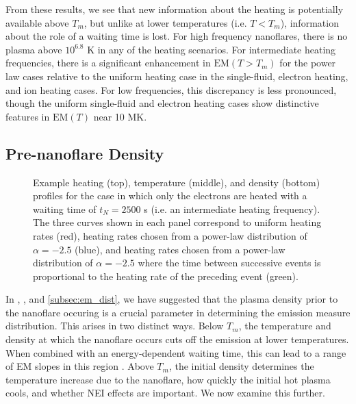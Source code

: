\documentclass[preprint,linenumbers]{aastex}
\begin{document}
	\par From these results, we see that new information about the heating is potentially available above $T_m$, but unlike at lower temperatures (i.e. $T<T_m$), information about the role of a waiting time is lost. For high frequency nanoflares, there is no plasma above $10^{6.8}$ K in any of the heating scenarios. For intermediate heating frequencies, there is a significant enhancement in $\mathrm{EM}(T>T_m)$ for the power law cases relative to the uniform heating case in the single-fluid, electron heating, and ion heating cases. For low frequencies, this discrepancy is less pronounced, though the uniform single-fluid and electron heating cases show distinctive features in $\mathrm{EM}(T)$ near 10 MK.
	\subsection{Pre-nanoflare Density}
	\label{subsec:pre_nanoflare_density}
	\begin{figure*}
		\caption{Example heating (top), temperature (middle), and density (bottom) profiles for the case in which only the electrons are heated with a waiting time of $t_N=2500$ s (i.e. an intermediate heating frequency). The three curves shown in each panel correspond to uniform heating rates (red), heating rates chosen from a power-law distribution of $\alpha=-2.5$ (blue), and heating rates chosen from a power-law distribution of $\alpha=-2.5$ where the time between successive events is proportional to the heating rate of the preceding event (green).}
		\label{fig:nT_sample_profiles}
	\end{figure*}
	\par In \citet{cargill_active_2014}, , and \autoref{subsec:em_dist}, we have suggested that the plasma density prior to the nanoflare occuring is a crucial parameter in determining the emission measure distribution. This arises in two distinct ways. Below $T_m$, the temperature and density at which the nanoflare occurs cuts off the emission at lower temperatures. When combined with an energy-dependent waiting time, this can lead to a range of EM slopes in this region \citep{cargill_active_2014}. Above $T_m$, the initial density determines the temperature increase due to the nanoflare, how quickly the initial hot plasma cools, and whether NEI effects are important. We now examine this further.
\end{document}
